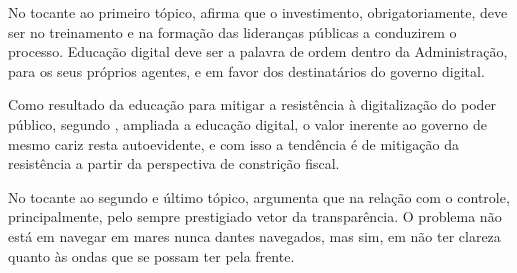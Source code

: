 No tocante ao primeiro tópico, \cite{do2022governo} afirma que o investimento, obrigatoriamente, deve ser no treinamento e na formação das lideranças públicas 
a conduzirem o processo. Educação digital deve ser a palavra de ordem dentro da Administração, para os seus próprios agentes, e em favor dos destinatários do governo digital. 

Como resultado da educação para mitigar a resistência à digitalização do poder público, segundo \cite{do2022governo}, ampliada a educação digital, o valor inerente ao governo de mesmo cariz resta autoevidente, e com isso a tendência é de mitigação da resistência a partir da perspectiva de constrição fiscal.

No tocante ao segundo e último tópico, \cite{do2022governo} argumenta que na relação com o controle, principalmente, pelo sempre prestigiado vetor da transparência. O problema não está em navegar em mares nunca dantes navegados, mas sim, em não ter clareza quanto às ondas que se possam ter pela frente.